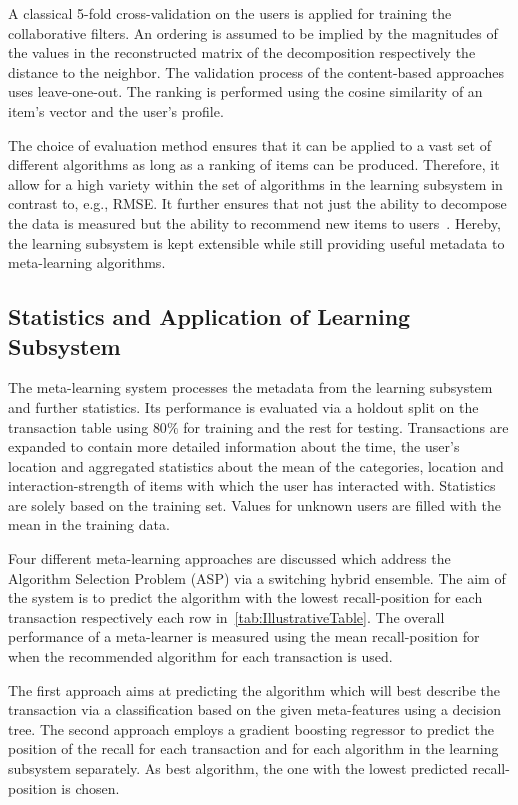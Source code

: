 \documentclass{IEEEtran}
\begin{document}
A classical 5-fold cross-validation on the users is applied for training the collaborative filters.  An ordering is assumed to be implied by the magnitudes of the values in the reconstructed matrix of the decomposition respectively the distance to the neighbor. The validation process of the content-based approaches uses leave-one-out. The ranking is performed using the cosine similarity of an item's vector and the user's profile.

The choice of evaluation method ensures that it can be applied to a vast set of different algorithms as long as a ranking of items can be produced. Therefore, it allow for a high variety within the set of algorithms in the learning subsystem in contrast to, e.g., RMSE. It further ensures that not just the ability to decompose the data is measured but the ability to recommend new items to users~\cite{Cremonesi:2010:PRA:1864708.1864721}. Hereby, the learning subsystem is kept extensible while still providing useful metadata to meta-learning algorithms.

\subsection{Statistics and Application of Learning Subsystem}
The meta-learning system processes the metadata from the learning subsystem and further statistics. Its performance is evaluated via a holdout split on the transaction table using $80\%$ for training and the rest for testing. Transactions are expanded to contain more detailed information about the time, the user's location and aggregated statistics about the mean of the categories, location and interaction-strength of items with which the user has interacted with. Statistics are solely based on the training set. Values for unknown users are filled with the mean in the training data.

Four different meta-learning approaches are discussed which address the Algorithm Selection Problem (ASP) via a switching hybrid ensemble. The aim of the system is to predict the algorithm with the lowest recall-position for each transaction respectively each row in~\autoref{tab:IllustrativeTable}. The overall performance of a meta-learner is measured using the mean recall-position for when the recommended algorithm for each transaction is used.

The first approach aims at predicting the algorithm which will best describe the transaction via a classification based on the given meta-features using a decision tree. The second approach employs a gradient boosting regressor to predict the position of the recall for each transaction and for each algorithm in the learning subsystem separately. As best algorithm, the one with the lowest predicted recall-position is chosen.
\end{document}
